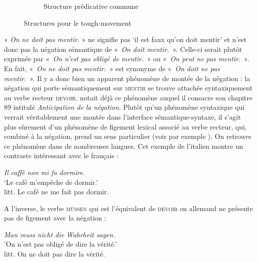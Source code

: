 {\begin{figure}[H]
\begin{subfigure}[h]{\textwidth}
		\caption{Structure prédicative commune}
	\end{subfigure}
\caption{Structures pour le tough-movement\label{fig:13-tough}}
\end{figure}

 « \textit{On ne doit pas mentir.} » ne signifie pas ‘il est faux qu'on doit mentir’ et
n’est donc pas la négation sémantique de «~\textit{On doit mentir.}~». Celle-ci serait plutôt exprimée par «~\textit{On n’est pas obligé de mentir.}~» ou «~\textit{On peut ne pas mentir.}~». En fait, «~\textit{On ne doit pas mentir.}~» est synonyme de «~\textit{On doit ne pas mentir.}~». Il y a donc bien un apparent phénomène de montée de la négation : la négation qui porte sémantiquement sur \textsc{mentir} se trouve attachée syntaxiquement au verbe recteur \textsc{devoir}. \citet{tesniere1959elements} notait déjà ce phénomène auquel il consacre son chapitre 89 intitulé \textit{Anticipation de la négation}. Plutôt qu’un phénomène syntaxique qui verrait véritablement une montée dans l’interface sémantique-syntaxe, il s’agit plus sûrement d’un phénomène de figement lexical associé au verbe recteur, qui, combiné à la négation, prend un sens particulier (voir par exemple \citealt{forest1994negation}). On retrouve ce phénomène dans de nombreuses langues. Cet exemple de l’italien montre un contraste intéressant avec le français :

\begin{exe}
\exi{} \textit{Il caffè non mi fa dormire.}\\
‘Le café m’empêche de dormir.’\\
litt. Le café ne me fait pas dormir.
\end{exe}
A l'inverse, le verbe \textsc{müssen} qui est l'équivalent de \textsc{devoir} en allemand ne présente pas de figement avec la négation :

\begin{exe}
\exi{} \textit{Man muss nicht die Wahrheit sagen.}\\
'On n'est pas obligé de dire la vérité.'\\
litt. On ne doit pas dire la vérité.
\end{exe}}

